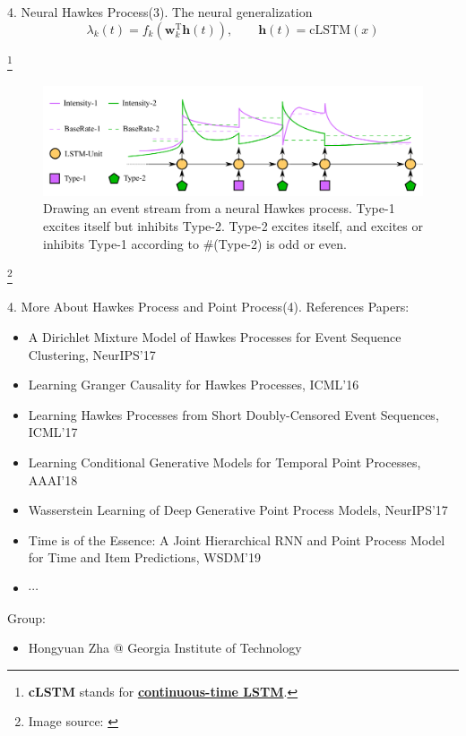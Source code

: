 \documentclass[professionalfonts]{beamer}
\newcommand\blfootnote[1]{		%
  \begingroup
  \renewcommand\thefootnote{}\footnote{#1}%
  \addtocounter{footnote}{-1}%
  \endgroup
}
\begin{document}
\begin{frame}{4. Neural Hawkes Process}{(3). The neural generalization}
$$\lambda_k(t) = f_k\left(\boldsymbol{w}_k^\text{T}\boldsymbol{h}(t)\right), \qquad \boldsymbol{h}(t) = \text{cLSTM}(x)$$

\blfootnote{\textbf{cLSTM} stands for \hyperlink{cLSTM}{\textbf{continuous-time LSTM}}.}

\begin{figure}[!ht]
\centering
\includegraphics[scale=.35]{Neural_Hawkes_process_demo.png}
\caption[Compact Routing Example]{Drawing an event stream from a neural Hawkes process. Type-1 excites itself but inhibits Type-2. Type-2 excites itself, and excites or inhibits Type-1 according to \#(Type-2) is odd or even.}
\end{figure}
\blfootnote{Image source: \cite{Mei2017}}

\end{frame}

\begin{frame}{4. More About Hawkes Process and Point Process}{(4). References}
Papers:

\begin{itemize}
	\item A Dirichlet Mixture Model of {\color{dbrown} Hawkes Processes} for Event Sequence Clustering, NeurIPS'17\cite{Hongteng2017}
	\item Learning Granger Causality for {\color{dbrown} Hawkes Processes}, ICML'16\cite{Hongteng2016}
	\item Learning {\color{dbrown} Hawkes Processes} from Short Doubly-Censored Event Sequences, ICML'17\cite{Hongteng2017_2}
	\item Learning Conditional Generative Models for Temporal {\color{dbrown} Point Processes}, AAAI'18\cite{Shuai2018}
	\item Wasserstein Learning of Deep Generative {\color{dbrown} Point Process} Models, NeurIPS'17\cite{XiaoFYYYSZ17}
	\item Time is of the Essence: A Joint Hierarchical RNN and {\color{dbrown} Point Process} Model for Time and Item Predictions, WSDM'19\cite{RSA19}
	\item $\cdots$
\end{itemize}

Group: 

\begin{itemize}
	\item Hongyuan Zha @ Georgia Institute of Technology
\end{itemize}
\end{frame}
\end{document}
